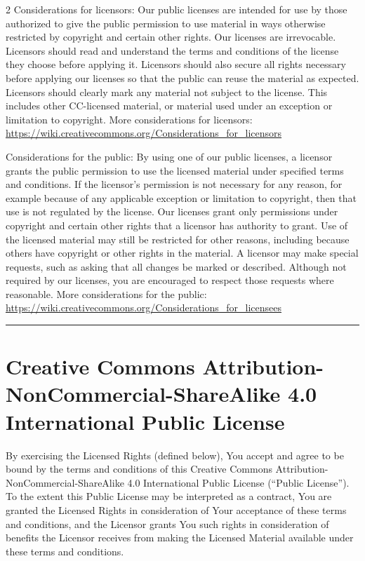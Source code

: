 \begin{multicols*}{2}
    Considerations for licensors: Our public licenses are intended for use
    by those authorized to give the public permission to use material in
    ways otherwise restricted by copyright and certain other rights. Our
    licenses are irrevocable. Licensors should read and understand the
    terms and conditions of the license they choose before applying it.
    Licensors should also secure all rights necessary before applying our
    licenses so that the public can reuse the material as expected.
    Licensors should clearly mark any material not subject to the license.
    This includes other CC-licensed material, or material used under an
    exception or limitation to copyright. More considerations for
    licensors: \url{https://wiki.creativecommons.org/Considerations_for_licensors}

    Considerations for the public: By using one of our public licenses, a
    licensor grants the public permission to use the licensed material
    under specified terms and conditions. If the licensor's permission is
    not necessary for any reason, for example because of any applicable
    exception or limitation to copyright, then that use is not regulated by
    the license. Our licenses grant only permissions under copyright and
    certain other rights that a licensor has authority to grant. Use of the
    licensed material may still be restricted for other reasons, including
    because others have copyright or other rights in the material. A
    licensor may make special requests, such as asking that all changes be
    marked or described. Although not required by our licenses, you are
    encouraged to respect those requests where reasonable. More
    considerations for the public:
    \url{https://wiki.creativecommons.org/Considerations_for_licensees}

    \noindent\rule{\linewidth}{0.4pt}


    \section*{Creative Commons Attribution-NonCommercial-ShareAlike 4.0 International Public License}

    By exercising the Licensed Rights (defined below), You accept and agree
    to be bound by the terms and conditions of this Creative Commons
    Attribution-NonCommercial-ShareAlike 4.0 International Public License
    (``Public License''). To the extent this Public License may be
    interpreted as a contract, You are granted the Licensed Rights in
    consideration of Your acceptance of these terms and conditions, and the
    Licensor grants You such rights in consideration of benefits the
    Licensor receives from making the Licensed Material available under
    these terms and conditions.



\end{multicols*}
